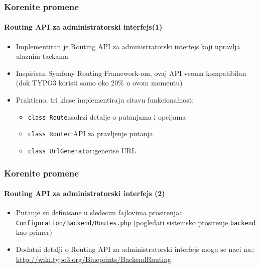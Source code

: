 \begin{frame}[fragile]
	\frametitle{Korenite promene}
	\framesubtitle{Routing API za administratorski interfejs(1)}

	\begin{itemize}
		\item Implementiran je Routing API za administratorski interfejs koji upravlja ulaznim tackama
		\item Inspirisan Symfony Routing Framework-om, ovaj API veoma kompatibilan\newline
			\small(dok TYPO3 koristi samo oko 20\% u ovom momentu)\normalsize

		\item Prakticno, tri klase implementiraju citavu funkcionalnost:
			\begin{itemize}
				\item \texttt{class Route}:\tabto{3.6cm}sadrzi detalje o putanjama i opcijama
				\item \texttt{class Router}:\tabto{3.6cm}API za pravljenje putanja
				\item \texttt{class UrlGenerator}:\tabto{3.6cm}generise URL
			\end{itemize}
	\end{itemize}

\end{frame}

\begin{frame}[fragile]
	\frametitle{Korenite promene}
	\framesubtitle{Routing API za administratorski interfejs (2)}

	\begin{itemize}

		\item Putanje su definisane u sledecim fajlovima prosirenja:
			\texttt{Configuration/Backend/Routes.php}\newline
			(pogledati sistemsko prosirenje \texttt{backend} kao primer)

		\item Dodatni detalji o Routing API za administratorski interfejs mogu se naci na::\newline
			\small\url{http://wiki.typo3.org/Blueprints/BackendRouting}\normalsize

	\end{itemize}

\end{frame}

